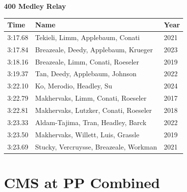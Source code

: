 \vspace{1.2em}
\noindent\begin{minipage}[t]{0.98\textwidth}
\centering
\textbf{\textcolor{teamprimary}{400 Medley Relay}}\par
\vspace{0.5em}
\centering
\small
\renewcommand{\arraystretch}{1.0}
\setlength{\tabcolsep}{4pt}
\begin{tabular}{@{}p{4.5cm}p{8.5cm}p{2.5cm}@{}}
\toprule
\textbf{Time} & \textbf{Name} & \textbf{Year} \\
\midrule
3:17.68 & Tekieli, Limm, Applebaum, Conati & 2021 \\
3:17.84 & Breazeale, Deedy, Applebaum, Krueger & 2023 \\
3:18.16 & Breazeale, Limm, Conati, Roeseler & 2019 \\
3:19.37 & Tan, Deedy, Applebaum, Johnson & 2022 \\
3:22.10 & Ko, Merodio, Headley, Su & 2024 \\
3:22.79 & Makhervaks, Limm, Conati, Roeseler & 2017 \\
3:22.81 & Makhervaks, Lutzker, Conati, Roeseler & 2018 \\
3:23.33 & Aldam-Tajima, Tran, Headley, Barck & 2022 \\
3:23.50 & Makhervaks, Willett, Luis, Grassle & 2019 \\
3:23.69 & Stucky, Vercruysse, Breazeale, Workman & 2021 \\
\bottomrule
\end{tabular}
\end{minipage}
\vspace{-0.5em}
\clearpage
\section{CMS at PP Combined}
\clearpage
